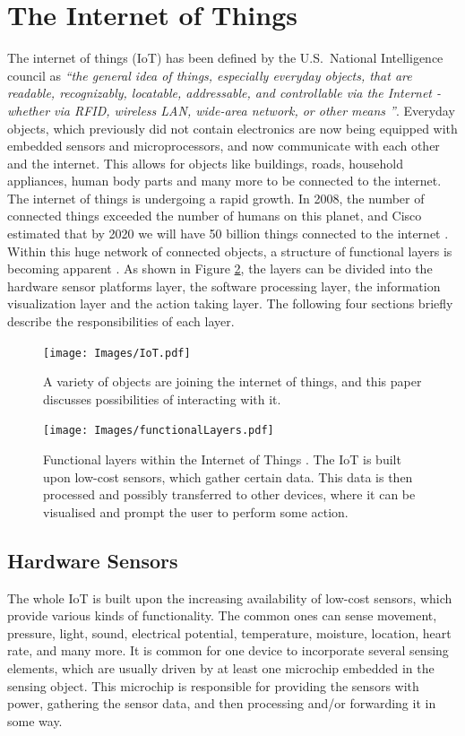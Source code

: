 \section{The Internet of Things}
\label{sec:internetOfThings}
The internet of things (IoT) has been defined by the U.S.\ National Intelligence council as \emph{``the general idea of things, especially everyday objects, that are readable, recognizably, locatable, addressable, and controllable via the Internet - whether via RFID, wireless LAN, wide-area network, or other means \cite{disruptiveTechnologies}''}.
Everyday objects, which previously did not contain electronics are now being equipped with embedded sensors and microprocessors, and now communicate with each other and the internet. 
This allows for objects like buildings, roads, household appliances, human body parts and many more to be connected to the internet. 
The internet of things is undergoing a rapid growth. 
In 2008, the number of connected things exceeded the number of humans on this planet, and Cisco estimated that by 2020 we will have 50 billion things connected to the internet \cite{evans12}. 
Within this huge network of connected objects, a structure of functional layers is becoming apparent \cite{swan12}. 
As shown in Figure \ref{fig:functionalLayers}, the layers can be divided into the hardware sensor platforms layer, the software processing layer, the information visualization layer and the action taking layer. 
The following four sections briefly describe the responsibilities of each layer.
\begin{figure}[!t]
\centering
\texttt{[image: Images/IoT.pdf]}
\caption{A variety of objects are joining the internet of things, and this paper discusses possibilities of interacting with it.}
\label{fig:iot}
\end{figure}

\begin{figure}[!t]
\centering
\texttt{[image: Images/functionalLayers.pdf]}
\caption{Functional layers within the Internet of Things \cite{swan12}. The IoT is built upon low-cost sensors, which gather certain data. This data is then processed and possibly transferred to other devices, where it can be visualised and prompt the user to perform some action.}
\label{fig:functionalLayers}
\end{figure}

\subsection{Hardware Sensors}
\label{sec:hardwareSensors}
The whole IoT is built upon the increasing availability of low-cost sensors, which provide various kinds of functionality.
The common ones can sense movement, pressure, light, sound, electrical potential, temperature, moisture, location, heart rate, and many more.
It is common for one device to incorporate several sensing elements, which are usually driven by at least one microchip embedded in the sensing object.
This microchip is responsible for providing the sensors with power, gathering the sensor data, and then processing and/or forwarding it in some way.

